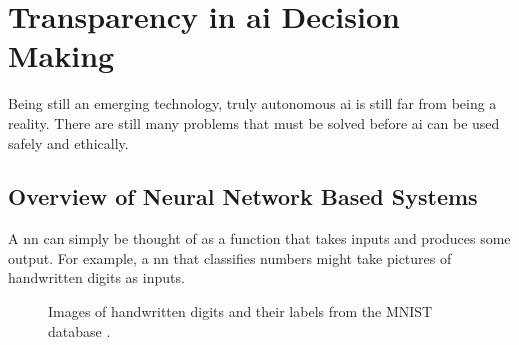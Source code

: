 \documentclass{report}
\begin{document}
\section{Transparency in \ac{ai} Decision Making}
Being still an emerging technology, truly autonomous \ac{ai} is still far from being a reality.
There are still many problems that must be solved before \ac{ai} can be used safely and ethically.

\subsection{Overview of Neural Network Based Systems}
A \ac{nn} can simply be thought of as a function that takes inputs and produces some output.
For example, a \ac{nn} that classifies numbers might take pictures of handwritten digits as inputs. 

\begin{figure}[h]
	\centering
	\caption[Handwritten Digit Samples]{
	Images of handwritten digits and their labels from the MNIST database \citep{mnistdb}.
	}
	\label{fig:mnist_digits}
\end{figure}
\end{document}
